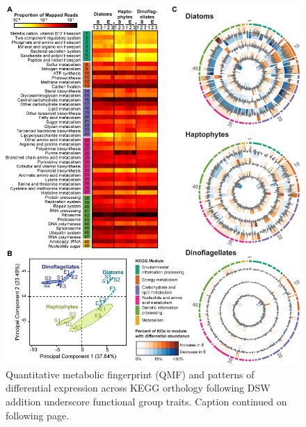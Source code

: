 \begin{figure}[p!]
  \centerline{\includegraphics[width=1.1\textwidth]{Images/C4_Figure2_Final.png}}
    \caption[Quantitative metabolic fingerprint (QMF) and patterns of differential expression across KEGG orthology following DSW addition underscore functional group traits]{Quantitative metabolic fingerprint (QMF) and patterns of differential expression across KEGG orthology following DSW addition underscore functional group traits. Caption continued on following page.}
  \label{fig:c4f2}

\end{figure}

